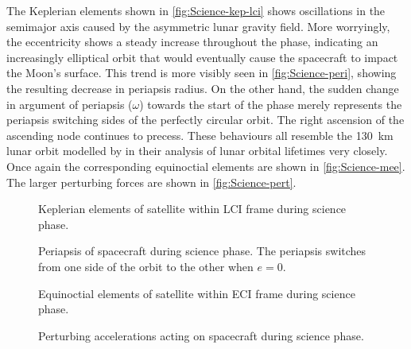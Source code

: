 The Keplerian elements shown in \autoref{fig:Science-kep-lci} shows oscillations in the semimajor axis caused by the asymmetric lunar gravity field. More worryingly, the eccentricity shows a steady increase throughout the phase, indicating an increasingly elliptical orbit that would eventually cause the spacecraft to impact the Moon's surface. This trend is more visibly seen in \autoref{fig:Science-peri}, showing the resulting decrease in periapsis radius. On the other hand, the sudden change in argument of periapsis ($\omega$) towards the start of the phase merely represents the periapsis switching sides of the perfectly circular orbit. The right ascension of the ascending node continues to precess. These behaviours all resemble the 130~km lunar orbit modelled by \textcite{Gupta2011} in their analysis of lunar orbital lifetimes very closely. Once again the corresponding equinoctial elements are shown in \autoref{fig:Science-mee}. The larger perturbing forces are shown in \autoref{fig:Science-pert}.

\begin{figure}
\centering
\def\svgwidth{\figurewidth}

\caption{Keplerian elements of satellite within LCI frame during science phase.} \label{fig:Science-kep-lci}
\end{figure}

\begin{figure}
\centering
\def\svgwidth{\figurewidth}

\caption{Periapsis of spacecraft during science phase. The periapsis switches from one side of the orbit to the other when $e=0$.} \label{fig:Science-peri}
\end{figure}

\begin{figure}
\centering
\def\svgwidth{\figurewidth}

\caption{Equinoctial elements of satellite within ECI frame during science phase.} \label{fig:Science-mee}
\end{figure}

\begin{figure}
\centering
\def\svgwidth{\figurewidth}

\caption{Perturbing accelerations acting on spacecraft during science phase.} \label{fig:Science-pert}
\end{figure}

%

